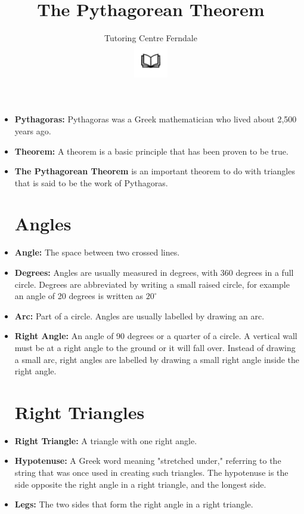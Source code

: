 \documentclass[12pt]{article}
\title{The Pythagorean Theorem}\\
\author{Tutoring Centre Ferndale\\
\includegraphics[width=4em]{ApS_logo.png}}
\date{}
\begin{document}
\maketitle

\begin{itemize}
\item \textbf{Pythagoras:} Pythagoras was a Greek mathematician who lived about 2,500 years ago.
\item \textbf{Theorem:} A theorem is a basic principle that has been proven to be true.
\item \textbf{The Pythagorean Theorem} is an important theorem to do with triangles that is said to be the work of Pythagoras.

\section*{Angles}
\item \textbf{Angle:} The space between two crossed lines.
\item \textbf{Degrees:} Angles are usually measured in degrees, with 360 degrees in a full circle. Degrees are abbreviated by writing a small raised circle, for example an angle of 20 degrees is written as $20^\circ$
\item \textbf{Arc:} Part of a circle. Angles are usually labelled by drawing an arc.
\item \textbf{Right Angle:} An angle of 90 degrees or a quarter of a circle. A vertical wall must be at a right angle to the ground or it will fall over. Instead of drawing a small arc, right angles are labelled by drawing a small right angle inside the right angle.


\section*{Right Triangles}
\item \textbf{Right Triangle:} A triangle with one right angle.
\item \textbf{Hypotenuse:} A Greek word meaning "stretched under," referring to the string that was once used in creating such triangles. The hypotenuse is the side opposite the right angle in a right triangle, and the longest side.
\item \textbf{Legs:} The two sides that form the right angle in a right triangle.
\end{itemize}
\end{document}
